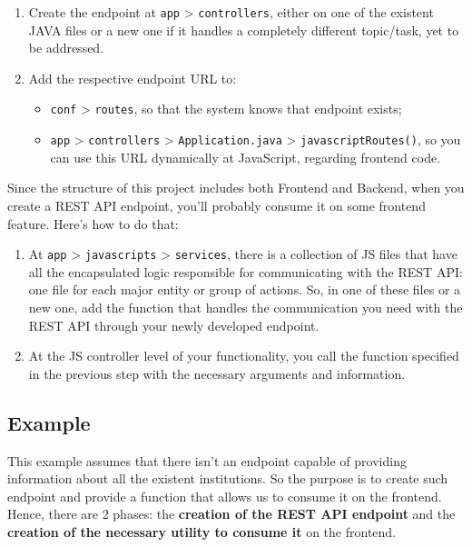 \documentclass[
  11pt,
]{krantz}
\providecommand{\tightlist}{%
  \setlength{\itemsep}{0pt}\setlength{\parskip}{0pt}}
\begin{document}
\begin{enumerate}
\def\labelenumi{\arabic{enumi}.}
\item
  Create the endpoint at \texttt{app} \textgreater{} \texttt{controllers}, either on one of the existent JAVA files or a new one if it handles a completely different topic/task, yet to be addressed.
\item
  Add the respective endpoint URL to:

  \begin{itemize}
  \tightlist
  \item
    \texttt{conf} \textgreater{} \texttt{routes}, so that the system knows that endpoint exists;
  \item
    \texttt{app} \textgreater{} \texttt{controllers} \textgreater{} \texttt{Application.java} \textgreater{} \texttt{javascriptRoutes()}, so you can use this URL dynamically at JavaScript, regarding frontend code.
  \end{itemize}
\end{enumerate}

Since the structure of this project includes both Frontend and Backend, when you create a REST API endpoint, you'll probably consume it on some frontend feature. Here's how to do that:

\begin{enumerate}
\def\labelenumi{\arabic{enumi}.}
\item
  At \texttt{app} \textgreater{} \texttt{javascripts} \textgreater{} \texttt{services}, there is a collection of JS files that have all the encapsulated logic responsible for communicating with the REST API: one file for each major entity or group of actions. So, in one of these files or a new one, add the function that handles the communication you need with the REST API through your newly developed endpoint.
\item
  At the JS controller level of your functionality, you call the function specified in the previous step with the necessary arguments and information.
\end{enumerate}

\hypertarget{example}{%
\subsection{Example}\label{example}}

This example assumes that there isn't an endpoint capable of providing information about all the existent institutions. So the purpose is to create such endpoint and provide a function that allows us to consume it on the frontend. Hence, there are 2 phases: the \textbf{creation of the REST API endpoint} and the \textbf{creation of the necessary utility to consume it} on the frontend.
\end{document}
